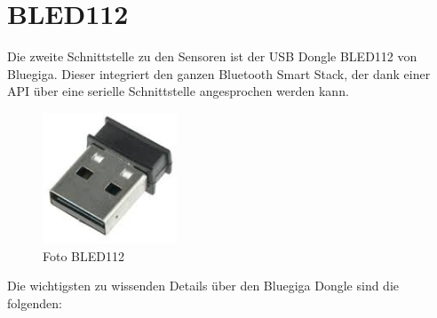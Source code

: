 


\section{BLED112}
Die zweite Schnittstelle zu den Sensoren ist der USB Dongle BLED112 von Bluegiga. Dieser integriert den ganzen Bluetooth Smart Stack, der dank einer API über eine serielle Schnittstelle angesprochen werden kann.

\begin{figure}[hbtp]
	\center
	\includegraphics[width=4cm]{bilder/bled112.jpg}
	\caption{Foto BLED112}
	\label{fig:bled112}
\end{figure}

Die wichtigsten zu wissenden Details über den Bluegiga Dongle sind die folgenden:

